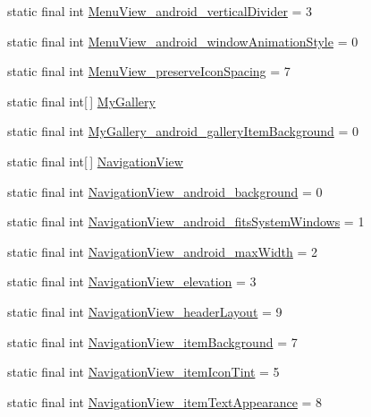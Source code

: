 \begin{DoxyCompactItemize}
static final int \hyperlink{classcheck_1_1test_1_1_r_1_1styleable_a32c0f0f19e2ec8e866a3c03c63f95680}{Menu\+View\+\_\+android\+\_\+vertical\+Divider} = 3
\item 
static final int \hyperlink{classcheck_1_1test_1_1_r_1_1styleable_ada6890b4f29ec20b02e8c982e454986d}{Menu\+View\+\_\+android\+\_\+window\+Animation\+Style} = 0
\item 
static final int \hyperlink{classcheck_1_1test_1_1_r_1_1styleable_ad1b55b20b2ab6b61d05dd41ed2312ff2}{Menu\+View\+\_\+preserve\+Icon\+Spacing} = 7
\item 
static final int\mbox{[}$\,$\mbox{]} \hyperlink{classcheck_1_1test_1_1_r_1_1styleable_a9c0880eccc65c48e229a8b4611d2b30f}{My\+Gallery}
\item 
static final int \hyperlink{classcheck_1_1test_1_1_r_1_1styleable_a289156879224bdba08596f12f78a9a86}{My\+Gallery\+\_\+android\+\_\+gallery\+Item\+Background} = 0
\item 
static final int\mbox{[}$\,$\mbox{]} \hyperlink{classcheck_1_1test_1_1_r_1_1styleable_a70ac59d722f1e4aac4b206dcf5f53107}{Navigation\+View}
\item 
static final int \hyperlink{classcheck_1_1test_1_1_r_1_1styleable_ad8bc81f909c3c15ed73a95d19448d19a}{Navigation\+View\+\_\+android\+\_\+background} = 0
\item 
static final int \hyperlink{classcheck_1_1test_1_1_r_1_1styleable_a69ae6facbf34d06b9f470f7471dfff79}{Navigation\+View\+\_\+android\+\_\+fits\+System\+Windows} = 1
\item 
static final int \hyperlink{classcheck_1_1test_1_1_r_1_1styleable_a14840a3ae29e9331de83b023e02fa994}{Navigation\+View\+\_\+android\+\_\+max\+Width} = 2
\item 
static final int \hyperlink{classcheck_1_1test_1_1_r_1_1styleable_a88ddf97958b48ba8933c1d24db5015fa}{Navigation\+View\+\_\+elevation} = 3
\item 
static final int \hyperlink{classcheck_1_1test_1_1_r_1_1styleable_ab9421b2c3084fab03258249932b7e0fd}{Navigation\+View\+\_\+header\+Layout} = 9
\item 
static final int \hyperlink{classcheck_1_1test_1_1_r_1_1styleable_a6f64b2a76b94c56288e3b8818af36228}{Navigation\+View\+\_\+item\+Background} = 7
\item 
static final int \hyperlink{classcheck_1_1test_1_1_r_1_1styleable_ae351f9847230f9848b52f060c63c4bdd}{Navigation\+View\+\_\+item\+Icon\+Tint} = 5
\item 
static final int \hyperlink{classcheck_1_1test_1_1_r_1_1styleable_ad7564a8ef74749a8d3928c139af4eaa6}{Navigation\+View\+\_\+item\+Text\+Appearance} = 8

\end{DoxyCompactItemize}
